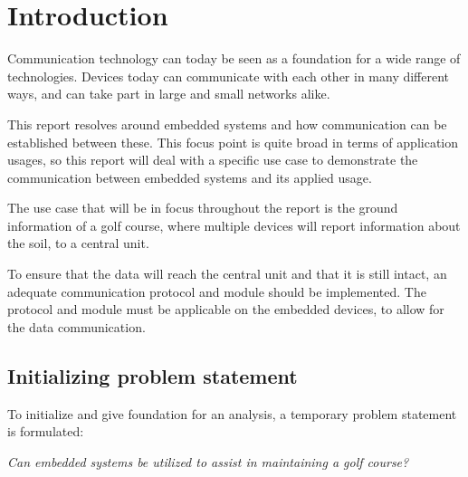 \chapter{Introduction}
Communication technology can today be seen as a foundation for a wide range of technologies. Devices today can communicate with each other in many different ways, and can take part in large and small networks alike.

This report resolves around embedded systems and how communication can be established between these. This focus point is quite broad in terms of application usages, so this report will deal with a specific use case to demonstrate the communication between embedded systems and its applied usage.

The use case that will be in focus throughout the report is the ground information of a golf course, where multiple devices will report information about the soil, to a central unit.


To ensure that the data will reach the central unit and that it is still intact, an adequate communication protocol and module should be implemented. The protocol and module must be applicable on the embedded devices, to allow for the data communication. 

\section*{Initializing problem statement}
To initialize and give foundation for an analysis, a temporary problem statement is formulated:

\textit{Can embedded systems be utilized to assist in maintaining a golf course?}


